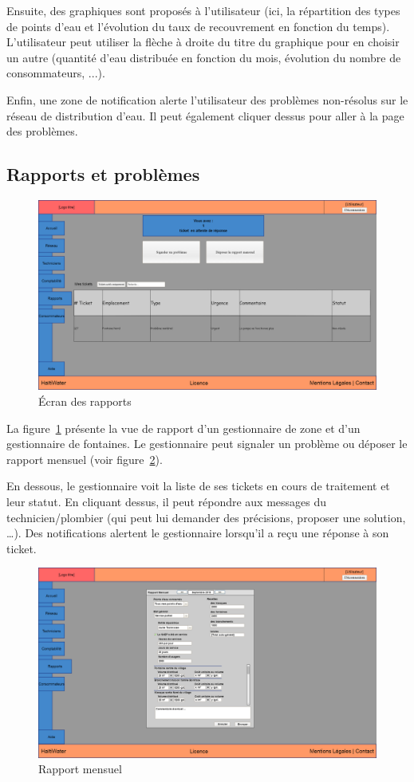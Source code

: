 \documentclass[a4paper, 11pt]{article}
\begin{document}
    Ensuite, des graphiques sont proposés à l'utilisateur (ici, la répartition des types de points d'eau et l'évolution du taux de recouvrement en fonction du temps). L'utilisateur peut utiliser la flèche à droite du titre du graphique pour en choisir un autre (quantité d'eau distribuée en fonction du mois, évolution du nombre de consommateurs, ...).

    Enfin, une zone de notification alerte l'utilisateur des problèmes non-résolus sur le réseau de distribution d'eau. Il peut également cliquer dessus pour aller à la page des problèmes.

  \subsection{Rapports et problèmes}
    \begin{figure}[H]
        \centering
        \includegraphics[width=.8\textwidth]{Cahier_des_Charges/rapports}
        \caption{\'Ecran des rapports}
        \label{fig:report}
    \end{figure}
    La figure~\ref{fig:report} présente la vue de rapport d'un gestionnaire de zone et d'un gestionnaire de fontaines. Le gestionnaire peut signaler un problème ou déposer le rapport mensuel (voir figure~\ref{fig:monthly_report}).

    En dessous, le gestionnaire voit la liste de ses tickets en cours de traitement et leur statut. En cliquant dessus, il peut répondre aux messages du technicien/plombier (qui peut lui demander des précisions, proposer une solution, \dots). Des notifications alertent le gestionnaire lorsqu'il a reçu une réponse à son ticket.

    \begin{figure}[H]
        \centering
        \includegraphics[width=.8\textwidth]{Cahier_des_Charges/rapports_mensuel}
        \caption{Rapport mensuel}
        \label{fig:monthly_report}
    \end{figure}
\end{document}
